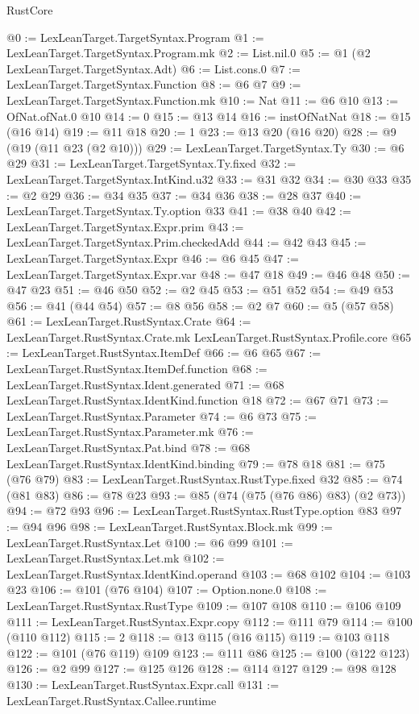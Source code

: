 \begin{lexlean}{RustCore}
\begin{coremodule}
@0 := LexLeanTarget.TargetSyntax.Program
@1 := LexLeanTarget.TargetSyntax.Program.mk
@2 := List.nil.{0}
@5 := @1 (@2 LexLeanTarget.TargetSyntax.Adt)
@6 := List.cons.{0}
@7 := LexLeanTarget.TargetSyntax.Function
@8 := @6 @7
@9 := LexLeanTarget.TargetSyntax.Function.mk
@10 := Nat
@11 := @6 @10
@13 := OfNat.ofNat.{0} @10
@14 := 0
@15 := @13 @14
@16 := instOfNatNat
@18 := @15 (@16 @14)
@19 := @11 @18
@20 := 1
@23 := @13 @20 (@16 @20)
@28 := @9 (@19 (@11 @23 (@2 @10)))
@29 := LexLeanTarget.TargetSyntax.Ty
@30 := @6 @29
@31 := LexLeanTarget.TargetSyntax.Ty.fixed
@32 := LexLeanTarget.TargetSyntax.IntKind.u32
@33 := @31 @32
@34 := @30 @33
@35 := @2 @29
@36 := @34 @35
@37 := @34 @36
@38 := @28 @37
@40 := LexLeanTarget.TargetSyntax.Ty.option @33
@41 := @38 @40
@42 := LexLeanTarget.TargetSyntax.Expr.prim
@43 := LexLeanTarget.TargetSyntax.Prim.checkedAdd
@44 := @42 @43
@45 := LexLeanTarget.TargetSyntax.Expr
@46 := @6 @45
@47 := LexLeanTarget.TargetSyntax.Expr.var
@48 := @47 @18
@49 := @46 @48
@50 := @47 @23
@51 := @46 @50
@52 := @2 @45
@53 := @51 @52
@54 := @49 @53
@56 := @41 (@44 @54)
@57 := @8 @56
@58 := @2 @7
@60 := @5 (@57 @58)
@61 := LexLeanTarget.RustSyntax.Crate
@64 := LexLeanTarget.RustSyntax.Crate.mk LexLeanTarget.RustSyntax.Profile.core
@65 := LexLeanTarget.RustSyntax.ItemDef
@66 := @6 @65
@67 := LexLeanTarget.RustSyntax.ItemDef.function
@68 := LexLeanTarget.RustSyntax.Ident.generated
@71 := @68 LexLeanTarget.RustSyntax.IdentKind.function @18
@72 := @67 @71
@73 := LexLeanTarget.RustSyntax.Parameter
@74 := @6 @73
@75 := LexLeanTarget.RustSyntax.Parameter.mk
@76 := LexLeanTarget.RustSyntax.Pat.bind
@78 := @68 LexLeanTarget.RustSyntax.IdentKind.binding
@79 := @78 @18
@81 := @75 (@76 @79)
@83 := LexLeanTarget.RustSyntax.RustType.fixed @32
@85 := @74 (@81 @83)
@86 := @78 @23
@93 := @85 (@74 (@75 (@76 @86) @83) (@2 @73))
@94 := @72 @93
@96 := LexLeanTarget.RustSyntax.RustType.option @83
@97 := @94 @96
@98 := LexLeanTarget.RustSyntax.Block.mk
@99 := LexLeanTarget.RustSyntax.Let
@100 := @6 @99
@101 := LexLeanTarget.RustSyntax.Let.mk
@102 := LexLeanTarget.RustSyntax.IdentKind.operand
@103 := @68 @102
@104 := @103 @23
@106 := @101 (@76 @104)
@107 := Option.none.{0}
@108 := LexLeanTarget.RustSyntax.RustType
@109 := @107 @108
@110 := @106 @109
@111 := LexLeanTarget.RustSyntax.Expr.copy
@112 := @111 @79
@114 := @100 (@110 @112)
@115 := 2
@118 := @13 @115 (@16 @115)
@119 := @103 @118
@122 := @101 (@76 @119) @109
@123 := @111 @86
@125 := @100 (@122 @123)
@126 := @2 @99
@127 := @125 @126
@128 := @114 @127
@129 := @98 @128
@130 := LexLeanTarget.RustSyntax.Expr.call
@131 := LexLeanTarget.RustSyntax.Callee.runtime

\end{coremodule}
\end{lexlean}
